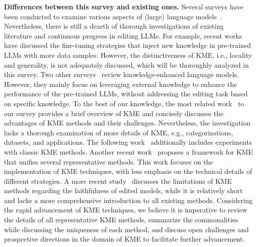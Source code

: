 \documentclass[acmsmall, screen]{acmart}
\begin{document}


\vspace{0.05in}
\noindent\textsf{\textbf{Differences between this survey and existing ones.}} 
Several surveys have been conducted to examine various aspects of (large) language models~\cite{zhao2023survey,kalyan2022ammu,thirunavukarasu2023large,fan2023recommender,chang2023survey,kasneci2023chatgpt}. Nevertheless, there is still a dearth of thorough investigations of existing literature and continuous progress in editing LLMs. For example, recent works~\cite{wang2023aligning,min2023recent} have discussed the fine-tuning strategies that inject new knowledge in pre-trained LLMs with more data samples. However, the distinctiveness of KME, i.e., locality and generality, is not adequately discussed, which will be thoroughly analyzed in this survey. Two other surveys~\cite{fei2021enriching,hu2023survey} review knowledge-enhanced language models. However, they mainly focus on leveraging external knowledge to enhance the performance of the pre-trained LLMs, without addressing the editing task based on specific knowledge. To the best of our knowledge, the most related work~\cite{yao2023editing} to our survey provides a brief overview of KME and concisely discusses the advantages of KME methods and their challenges. Nevertheless, the investigation lacks a thorough examination of more details of KME, e.g., categorizations, datasets, and applications. The following work~\cite{zhang2024comprehensive} additionally includes experiments with classic KME methods.
Another recent work~\cite{wang2023easyedit} proposes a framework for KME that unifies several representative methods. This work focuses on the implementation of KME techniques, with less emphasis on the technical details of different strategies. A more recent study~\cite{pinter2023emptying} discusses the limitations of KME methods regarding the faithfulness of edited models, while it is relatively short and lacks a more comprehensive introduction to all existing methods.
Considering the rapid advancement of KME techniques, we believe it is imperative to review the details of all representative KME methods, summarize the commonalities while discussing the uniqueness of each method, and discuss open challenges and prospective directions in the domain of KME to facilitate further advancement. 
\end{document}
